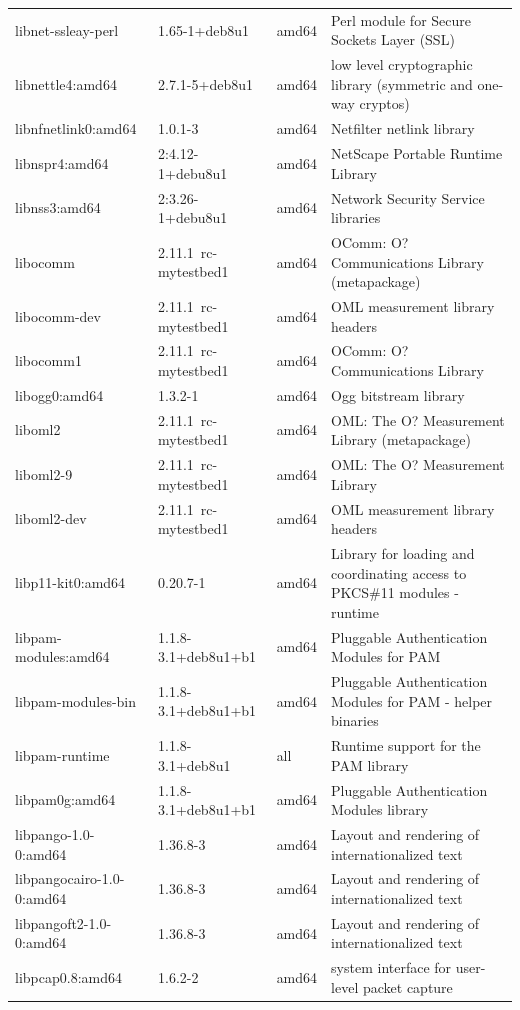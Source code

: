 \documentclass[a4paper,10pt]{article}
\begin{document}
\begin{appendices}
{\begin{longtable}{p{3.25cm}@{\hspace{0.25cm}}p{4cm}@{\hspace{0.25cm}}l@{\hspace{0.25cm}}p{7cm}}
libnet-ssleay-perl	&	1.65-1+deb8u1	&	amd64	&	Perl module for Secure Sockets Layer (SSL)	\\
libnettle4:amd64	&	2.7.1-5+deb8u1	&	amd64	&	low level cryptographic library (symmetric and one-way cryptos)	\\
libnfnetlink0:amd64	&	1.0.1-3	&	amd64	&	Netfilter netlink library	\\
libnspr4:amd64	&	2:4.12-1+debu8u1	&	amd64	&	NetScape Portable Runtime Library	\\
libnss3:amd64	&	2:3.26-1+debu8u1	&	amd64	&	Network Security Service libraries	\\
libocomm	&	2.11.1~rc-mytestbed1	&	amd64	&	OComm:  O? Communications Library (metapackage)	\\
libocomm-dev	&	2.11.1~rc-mytestbed1	&	amd64	&	OML measurement library headers	\\
libocomm1	&	2.11.1~rc-mytestbed1	&	amd64	&	OComm:  O? Communications Library	\\
libogg0:amd64	&	1.3.2-1	&	amd64	&	Ogg bitstream library	\\
liboml2	&	2.11.1~rc-mytestbed1	&	amd64	&	OML: The O? Measurement Library (metapackage)	\\
liboml2-9	&	2.11.1~rc-mytestbed1	&	amd64	&	OML: The O? Measurement Library	\\
liboml2-dev	&	2.11.1~rc-mytestbed1	&	amd64	&	OML measurement library headers	\\
libp11-kit0:amd64	&	0.20.7-1	&	amd64	&	Library for loading and coordinating access to PKCS\#11 modules - runtime	\\
libpam-modules:amd64	&	1.1.8-3.1+deb8u1+b1	&	amd64	&	Pluggable Authentication Modules for PAM	\\
libpam-modules-bin	&	1.1.8-3.1+deb8u1+b1	&	amd64	&	Pluggable Authentication Modules for PAM - helper binaries	\\
libpam-runtime	&	1.1.8-3.1+deb8u1	&	all	&	Runtime support for the PAM library	\\
libpam0g:amd64	&	1.1.8-3.1+deb8u1+b1	&	amd64	&	Pluggable Authentication Modules library	\\
libpango-1.0-0:amd64	&	1.36.8-3	&	amd64	&	Layout and rendering of internationalized text	\\
libpangocairo-1.0-0:amd64	&	1.36.8-3	&	amd64	&	Layout and rendering of internationalized text	\\
libpangoft2-1.0-0:amd64	&	1.36.8-3	&	amd64	&	Layout and rendering of internationalized text	\\
libpcap0.8:amd64	&	1.6.2-2	&	amd64	&	system interface for user-level packet capture	\\

\end{longtable}}
\end{appendices}
\end{document}
